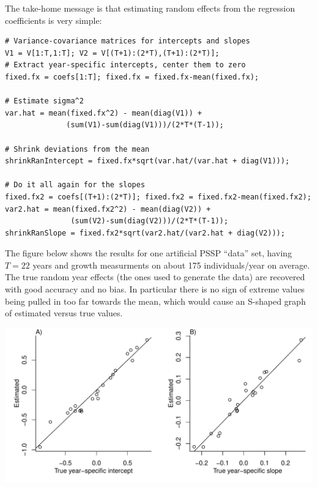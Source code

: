 \documentclass[12pt]{article}
\begin{document}
The take-home message is that estimating random effects from the regression coefficients is very simple: 
\begin{lstlisting}
# Variance-covariance matrices for intercepts and slopes
V1 = V[1:T,1:T]; V2 = V[(T+1):(2*T),(T+1):(2*T)]; 
# Extract year-specific intercepts, center them to zero   
fixed.fx = coefs[1:T]; fixed.fx = fixed.fx-mean(fixed.fx); 

# Estimate sigma^2
var.hat = mean(fixed.fx^2) - mean(diag(V1)) + 
              (sum(V1)-sum(diag(V1)))/(2*T*(T-1)); 

# Shrink deviations from the mean 
shrinkRanIntercept = fixed.fx*sqrt(var.hat/(var.hat + diag(V1)));

# Do it all again for the slopes 
fixed.fx2 = coefs[(T+1):(2*T)]; fixed.fx2 = fixed.fx2-mean(fixed.fx2); 
var2.hat = mean(fixed.fx2^2) - mean(diag(V2)) + 
               (sum(V2)-sum(diag(V2)))/(2*T*(T-1)); 
shrinkRanSlope = fixed.fx2*sqrt(var2.hat/(var2.hat + diag(V2))); 
\end{lstlisting}

The figure below shows the results for one artificial PSSP ``data'' set, having $T=22$ years and growth measurments on 
about 175 individuals/year on average. The true random year effects (the ones used to generate the data) are recovered
with good accuracy and no bias. In particular there is no sign of extreme values being pulled in too far
towards the mean, which would cause an S-shaped graph of estimated versus true values. 

\bigskip 

\centerline{\includegraphics[width=\textwidth]{figures/SimpleShrinkage.pdf}}

  
\end{document}
